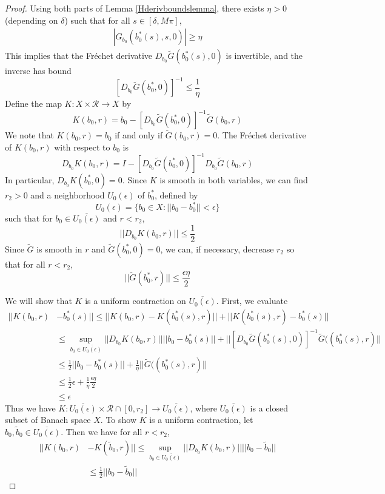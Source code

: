 \documentclass[thesis.tex]{subfiles}
\begin{document}
\begin{lemma}
\begin{proof}
Using both parts of Lemma \ref{Hderivboundslemma}, there exists $\eta > 0$ (depending on $\delta$) such that for all $s \in [\delta, M \pi]$,
\begin{align*}
|G_{b_0}( b_0^*(s), s, 0)| \geq \eta 
\end{align*}
This implies that the Fr\'echet derivative $D_{b_0} \tilde{G}(b_0^*(s), 0)$ is invertible, and the inverse has bound
\[
[D_{b_0} \tilde{G}(b_0^*, 0)]^{-1} \leq \frac{1}{\eta}
\]
Define the map $K: X \times \mathcal{R} \rightarrow X$ by
\begin{equation}\label{defKb0}
K(b_0, r) = b_0 - [D_{b_0} \tilde{G}(b_0^*, 0)]^{-1} \tilde{G}(b_0, r)
\end{equation}
We note that $K(b_0, r) = b_0$ if and only if $\tilde{G}(b_0, r) = 0$. The Fr\'echet derivative of $K(b_0, r)$ with respect to $b_0$ is 
\begin{equation}\label{DKb0}
D_{b_0} K(b_0, r) = I - [D_{b_0} \tilde{G}(b_0^*, 0)]^{-1} D_{b_0} \tilde{G}(b_0, r)
\end{equation}
In particular, $D_{b_0} K(b_0^*, 0) = 0$. Since $K$ is smooth in both variables, we can find $r_2 > 0$ and a neighborhood $U_0(\epsilon)$ of $b_0^*$, defined by
\[
U_0(\epsilon) = \{ b_0 \in X : ||b_0 -  b_0^*|| < \epsilon \}
\]
such that for $b_0 \in \overline{U_0(\epsilon)}$ and $r < r_2$,
\[
||D_{b_0} K(b_0, r)|| \leq \frac{1}{2}
\]
Since $\tilde{G}$ is smooth in $r$ and $\tilde{G}(b_0^*, 0) = 0$, we can, if necessary, decrease $r_2$ so that for all $r < r_2$,
\[
||\tilde{G}(b_0^*, r)|| \leq \frac{\epsilon \eta}{2}
\]

We will show that $K$ is a uniform contraction on $\overline{U_0(\epsilon)}$. First, we evaluate
\begin{align*}
|| K(b_0, r) &- b_0^*(s) || \leq 
|| K(b_0, r) - K(b_0^*(s), r) || + 
|| K(b_0^*(s), r) - b_0^*(s) || \\
&\leq \sup_{b_0 \in \overline{U_0(\epsilon)}}||D_{b_0} K(b_0, r)|| ||b_0 - b_0^*(s)|| + ||[D_{b_0} \tilde{G}(b_0^*(s), 0)]^{-1} \tilde{G}((b_0^*(s), r)|| \\
&\leq \frac{1}{2}||b_0 - b_0^*(s)|| + \frac{1}{\eta}||\tilde{G}((b_0^*(s), r)|| \\
&\leq \frac{1}{2}\epsilon + \frac{1}{\eta}\frac{\epsilon \eta}{2} \\
&\leq \epsilon
\end{align*}
Thus we have $K: \overline{U_0(\epsilon)} \times \mathcal{R} \cap [0, r_2] \rightarrow \overline{U_0(\epsilon)}$, where $\overline{U_0(\epsilon)}$ is a closed subset of Banach space $X$. To show $K$ is a uniform contraction, let $b_0, \tilde{b}_0 \in \overline{U_0(\epsilon)}$. Then we have for all $r < r_2$,
\begin{align*}
|| K(b_0, r) &- K(\tilde{b}_0, r) || 
\leq \sup_{b_0 \in \overline{U_0(\epsilon)}}||D_{b_0} K(b_0, r)|| ||b_0 - \tilde{b}_0 || \\
&\leq \frac{1}{2}||b_0 - \tilde{b}_0 ||
\end{align*}


\end{proof}
\end{lemma}
\end{document}

